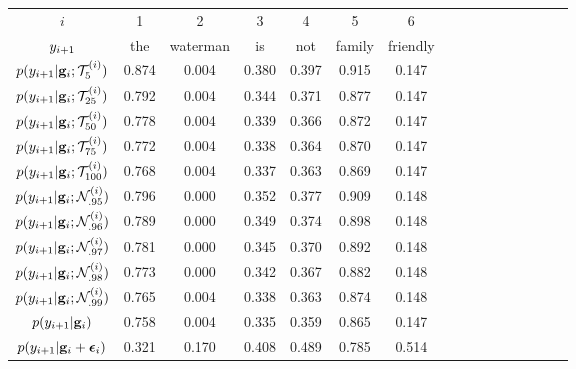 \begin{table}
    \centering
    \begin{tabular}{c ccc ccc ccc ccc ccc}
        \toprule
        $i$ & 1 & 2 & 3 & 4 &5 & 6 \\
        $y_{i+1}$ &  the  & waterman &is &not& family & friendly \\
        \midrule
        $p(y_{i+1}|\mathbf{g}_i; {\mathcal{T}}_{5}^{(i)})$ & 0.874 & 0.004 & 0.380 & 0.397 & 0.915 & 0.147 \\
    $p(y_{i+1}|\mathbf{g}_i; {\mathcal{T}}_{25}^{(i)})$ &
0.792 & 0.004 & 0.344 & 0.371 & 0.877 & 0.147 \\
     $p(y_{i+1}|\mathbf{g}_i; {\mathcal{T}}_{50}^{(i)})$ &
0.778 & 0.004 & 0.339 & 0.366 & 0.872 & 0.147 \\
       $p(y_{i+1}|\mathbf{g}_i; {\mathcal{T}}_{75}^{(i)})$ &
0.772 & 0.004 & 0.338 & 0.364 & 0.870 & 0.147 \\
        $p(y_{i+1}|\mathbf{g}_i; {\mathcal{T}}_{100}^{(i)})$ & 
0.768 & 0.004 & 0.337 & 0.363 & 0.869 & 0.147 \\
        \midrule
     $p(y_{i+1}|\mathbf{g}_i; {\mathcal{N}}_{.95}^{(i)})$     & 
0.796 & 0.000 & 0.352 & 0.377 & 0.909 & 0.148 \\
     $p(y_{i+1}|\mathbf{g}_i; {\mathcal{N}}_{.96}^{(i)})$ &
0.789 & 0.000 & 0.349 & 0.374 & 0.898 & 0.148 \\
      $p(y_{i+1}|\mathbf{g}_i; {\mathcal{N}}_{.97}^{(i)})$ &
0.781 & 0.000 & 0.345 & 0.370 & 0.892 & 0.148 \\
     $p(y_{i+1}|\mathbf{g}_i; {\mathcal{N}}_{.98}^{(i)})$ &
0.773 & 0.000 & 0.342 & 0.367 & 0.882 & 0.148 \\ 
     $p(y_{i+1}|\mathbf{g}_i; {\mathcal{N}}_{.99}^{(i)})$ &
0.765 & 0.004 & 0.338 & 0.363 & 0.874 & 0.148 \\
        \midrule
        $p(y_{i+1}|\mathbf{g}_i)$ &0.758 & 0.004 & 0.335 & 0.359 & 0.865 & 0.147 \\
        $p(y_{i+1}|\mathbf{g}_i + \boldsymbol{\epsilon}_i)$ & 0.321 & 0.170 & 0.408 & 0.489 & 0.785 & 0.514 \\
        \bottomrule
    \end{tabular}

~\\~\\~\\~\\



\end{table}
